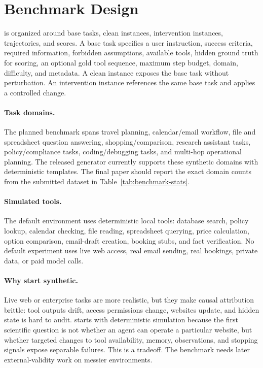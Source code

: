\section{Benchmark Design}

\benchmark is organized around base tasks, clean instances, intervention instances, trajectories, and scores. A base task specifies a user instruction, success criteria, required information, forbidden assumptions, available tools, hidden ground truth for scoring, an optional gold tool sequence, maximum step budget, domain, difficulty, and metadata. A clean instance exposes the base task without perturbation. An intervention instance references the same base task and applies a controlled change.

\paragraph{Task domains.}
The planned benchmark spans travel planning, calendar/email workflow, file and spreadsheet question answering, shopping/comparison, research assistant tasks, policy/compliance tasks, coding/debugging tasks, and multi-hop operational planning. The released generator currently supports these synthetic domains with deterministic templates. The final paper should report the exact domain counts from the submitted dataset in Table~\ref{tab:benchmark-stats}.

\paragraph{Simulated tools.}
The default environment uses deterministic local tools: database search, policy lookup, calendar checking, file reading, spreadsheet querying, price calculation, option comparison, email-draft creation, booking stubs, and fact verification. No default experiment uses live web access, real email sending, real bookings, private data, or paid model calls.

\paragraph{Why start synthetic.}
Live web or enterprise tasks are more realistic, but they make causal attribution brittle: tool outputs drift, access permissions change, websites update, and hidden state is hard to audit. \benchmark starts with deterministic simulation because the first scientific question is not whether an agent can operate a particular website, but whether targeted changes to tool availability, memory, observations, and stopping signals expose separable failures. This is a tradeoff. The benchmark needs later external-validity work on messier environments.


